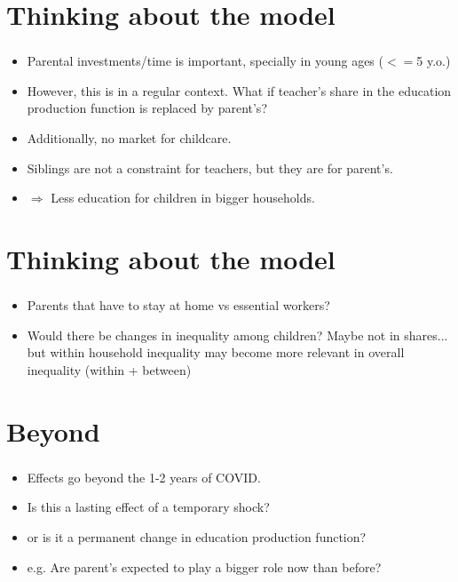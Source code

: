 \documentclass{beamer}
\begin{document}
\section{Thinking about the model}
\begin{frame}
    \label{update_scott}
    \frametitle{}
    \begin{itemize}
        \item Parental investments/time is important, specially in young ages ($<=$5 y.o.)
        \item However, this is in a regular context. What if teacher's share in the education production function is replaced by parent's?
        \item Additionally, no market for childcare.
        \item Siblings are not a constraint for teachers, but they are for parent's.
        \item $\Rightarrow$ Less education for children in bigger households.
    \end{itemize}
\end{frame}




\section{Thinking about the model}
\begin{frame}
    \label{update_scott}
    \frametitle{}
    \begin{itemize}
        \item Parents that have to stay at home vs essential workers?
        \item Would there be changes in inequality among children? Maybe not in shares... but within household inequality may become more relevant in overall inequality (within + between)
    \end{itemize}
\end{frame}

\section{Beyond}
\begin{frame}
    \label{update_scott}
    \frametitle{}
    \begin{itemize}
        \item Effects go beyond the 1-2 years of COVID.
        \item Is this a lasting effect of a temporary shock?
        \item or is it a permanent change in education production function?
        \item e.g. Are parent's expected to play a bigger role now than before?
    \end{itemize}
\end{frame}
\end{document}
